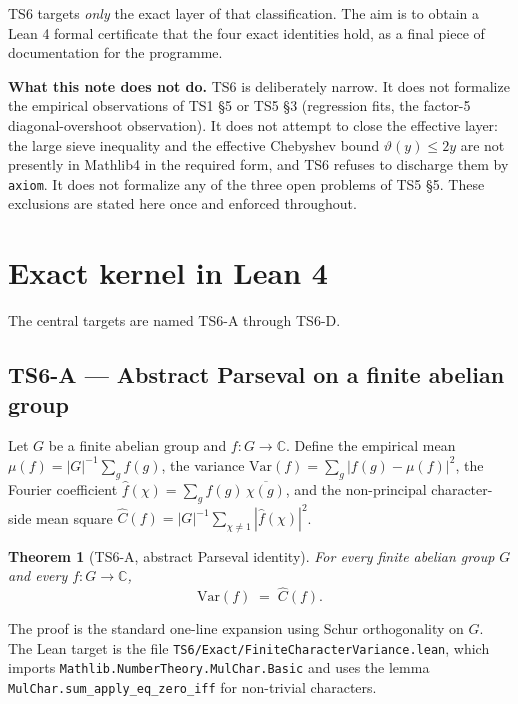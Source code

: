 \documentclass[11pt,a4paper]{article}
\newtheorem{theorem}{Theorem}[section]
\begin{document}
TS6 targets \emph{only} the exact layer of that classification. The aim is
to obtain a Lean 4 formal certificate that the four exact identities hold,
as a final piece of documentation for the programme.

\smallskip

\noindent\textbf{What this note does not do.}
TS6 is deliberately narrow. It does not formalize the empirical
observations of TS1 \S5 or TS5 \S3 (regression fits, the factor-5
diagonal-overshoot observation). It does not attempt to close the effective
layer: the large sieve inequality and the effective Chebyshev bound
$\vartheta(y) \le 2y$ are not presently in Mathlib4 in the required form,
and TS6 refuses to discharge them by \texttt{axiom}. It does not formalize
any of the three open problems of TS5 \S5. These exclusions are stated
here once and enforced throughout.

\section{Exact kernel in Lean 4}\label{sec:exact}

The central targets are named TS6-A through TS6-D.

\subsection*{TS6-A --- Abstract Parseval on a finite abelian group}

Let $G$ be a finite abelian group and $f : G \to \mathbb C$. Define the
empirical mean $\mu(f) = |G|^{-1} \sum_{g} f(g)$, the variance
$\mathrm{Var}(f) = \sum_{g} |f(g) - \mu(f)|^{2}$, the Fourier coefficient
$\widehat f(\chi) = \sum_{g} f(g)\,\overline{\chi(g)}$, and the
non-principal character-side mean square
$\widehat C(f) = |G|^{-1} \sum_{\chi \ne 1} |\widehat f(\chi)|^{2}$.

\begin{theorem}[TS6-A, abstract Parseval identity]\label{thm:A}
For every finite abelian group $G$ and every $f : G \to \mathbb C$,
\[
\mathrm{Var}(f) \;=\; \widehat C(f).
\]
\end{theorem}

The proof is the standard one-line expansion using Schur orthogonality on
$G$. The Lean target is the file \texttt{TS6/Exact/FiniteCharacterVariance.lean},
which imports \texttt{Mathlib.NumberTheory.MulChar.Basic} and uses the
lemma \texttt{MulChar.sum\_apply\_eq\_zero\_iff} for non-trivial characters.
\end{document}

